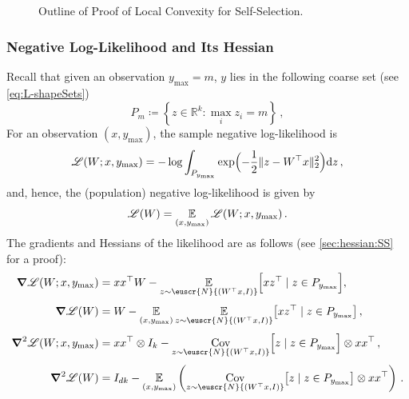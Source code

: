 \documentclass[11pt,letterpaper]{article}
\theoremstyle{plain}
\theoremstyle{definition}
\theoremstyle{remark}
\newcommand{\inbrace}[1]{\ensuremath{\left\{#1\right\}}}
\newcommand{\inparen}[1]{\ensuremath{\left(#1\right)}}
\newcommand{\R}{\mathbb{R}}
\newcommand{\E}{\operatornamewithlimits{\mathbb{E}}}
\newcommand{\Ex}{\E}
\newcommand{\cov}{\ensuremath{\operatornamewithlimits{\rm Cov}}}
\newcommand{\customcal}[1]{\euscr{#1}}
\newcommand{\cL}{\customcal{L}}
\newcommand{\cN}{\customcal{N}}
\newcommand{\negLL}{\ensuremath{\mathscr{L}}}
\renewcommand{\d}{{\rm d}}
\newcommand{\normal}[2]{\cN{\inparen{#1,#2}}}
\newcommand{\ymax}{y_{\max}}
\renewcommand{\cL}{\negLL}
\begin{document}
{{\begin{figure}[ht]
    \caption{Outline of Proof of Local Convexity for Self-Selection.
    }
    \label{fig:outline:SS:LC}
\end{figure}


\subsubsection{Negative Log-Likelihood and Its Hessian}
    Recall that given an observation $\ymax=m$, $y$ lies in the following coarse set (see \cref{eq:L-shapeSets})
    \[
    P_m \coloneqq \inbrace{z \in \R^k : \max_i z_i = m}\,,
    \]
    For an observation $(x,\ymax)$, the sample negative log-likelihood is
    \[
    \cL(W; x,\ymax) = -\log\int_{P_{\ymax}} \exp\Bigl(-\frac{1}{2}\|z-W^\top x\|_2^2\Bigr)\d z\,,
    \]
    and, hence, the (population) negative log-likelihood is given by
    \[
    \cL(W) = \Ex_{(x,\ymax)}\cL(W; x,\ymax)\,.
    \]
    The gradients and Hessians of the likelihood are as follows (see \cref{sec:hessian:SS} for a proof):
    \begin{align}
    \grad \cL(W; x,\ymax) &= xx^\top W - \Ex_{z\sim \normal{W^\top x}{I}}\Bigl[xz^\top \mid z\in P_{\ymax}\Bigr],\\[1mm]
    \grad \cL(W) &= W - {\Ex_{(x,\ymax)}}\Ex_{z\sim \normal{W^\top x}{I}}\bigl[xz^\top \mid z\in P_{\ymax}\bigr]\,,\\[1mm]
    \grad^2 \cL(W; x,\ymax) &= xx^\top\otimes I_{k} - \cov_{z\sim \normal{W^\top x}{I}}\Bigl[z \mid z\in P_{\ymax}\Bigr]\otimes xx^\top\,, \label{eq:SS:conditionalHess:mainBody}\\[1mm]
    \grad^2 \cL(W) &= I_{dk} - \Ex_{(x,\ymax)}\inparen{\cov_{z\sim \normal{W^\top x}{I}}\bigl[z \mid z\in P_{\ymax}\bigr]\otimes xx^\top}\,.
    \end{align}

}}
\end{document}
